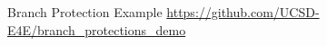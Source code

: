 \documentclass[aspectratio=169]{beamer}
\begin{document}
\begin{frame}{Branch Protection Example}
    \url{https://github.com/UCSD-E4E/branch_protections_demo}
\end{frame}



\end{document}
